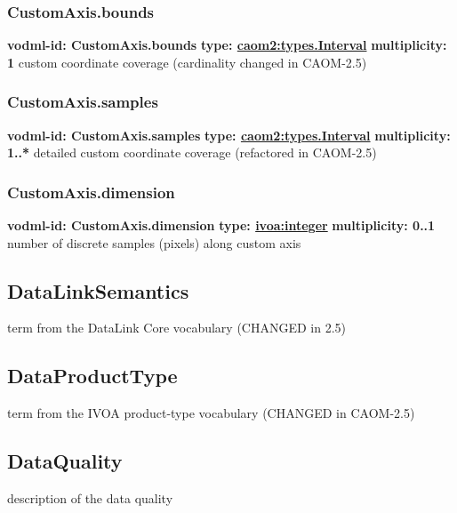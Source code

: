     \subsubsection{CustomAxis.bounds}
      \textbf{vodml-id: CustomAxis.bounds} \newline
      \textbf{type: \hyperref[sect:types.Interval]{caom2:types.Interval}} \newline
      \textbf{multiplicity: 1} \newline
      custom coordinate coverage (cardinality changed in CAOM-2.5)

    \subsubsection{CustomAxis.samples}
      \textbf{vodml-id: CustomAxis.samples} \newline
      \textbf{type: \hyperref[sect:types.Interval]{caom2:types.Interval}} \newline
      \textbf{multiplicity: 1..*} \newline
      detailed custom coordinate coverage (refactored in CAOM-2.5)

    \subsubsection{CustomAxis.dimension}
      \textbf{vodml-id: CustomAxis.dimension} \newline
      \textbf{type: \hyperref[sect:ivoa]{ivoa:integer}} \newline
      \textbf{multiplicity: 0..1} \newline
      number of discrete samples (pixels) along custom axis

  \subsection{DataLinkSemantics}
  \label{sect:DataLinkSemantics}
    term from the DataLink Core vocabulary (CHANGED in 2.5)

  \subsection{DataProductType}
  \label{sect:DataProductType}
    term from the IVOA product-type vocabulary (CHANGED in CAOM-2.5)

  \subsection{DataQuality}
  \label{sect:DataQuality}
    description of the data quality

